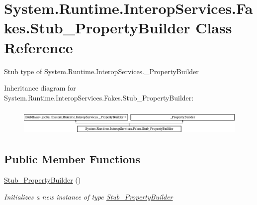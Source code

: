 \hypertarget{class_system_1_1_runtime_1_1_interop_services_1_1_fakes_1_1_stub___property_builder}{\section{System.\-Runtime.\-Interop\-Services.\-Fakes.\-Stub\-\_\-\-Property\-Builder Class Reference}
\label{class_system_1_1_runtime_1_1_interop_services_1_1_fakes_1_1_stub___property_builder}
}


Stub type of System.\-Runtime.\-Interop\-Services.\-\_\-\-Property\-Builder 


Inheritance diagram for System.\-Runtime.\-Interop\-Services.\-Fakes.\-Stub\-\_\-\-Property\-Builder\-:\begin{figure}[H]
\begin{center}
\leavevmode
\includegraphics[height=1.346154cm]{class_system_1_1_runtime_1_1_interop_services_1_1_fakes_1_1_stub___property_builder}
\end{center}
\end{figure}
\subsection*{Public Member Functions}
\begin{DoxyCompactItemize}
\item 
\hyperlink{class_system_1_1_runtime_1_1_interop_services_1_1_fakes_1_1_stub___property_builder_a83605acce507e9a42f61a2f43f7cbb45}{Stub\-\_\-\-Property\-Builder} ()
\begin{DoxyCompactList}\small\item\em Initializes a new instance of type \hyperlink{class_system_1_1_runtime_1_1_interop_services_1_1_fakes_1_1_stub___property_builder}{Stub\-\_\-\-Property\-Builder}\end{DoxyCompactList}\end{DoxyCompactItemize}
